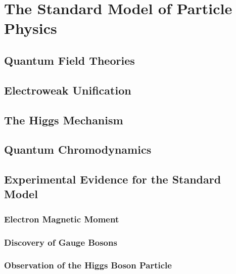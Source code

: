 \section{The Standard Model of Particle Physics}

\subsection{Quantum Field Theories}

\subsection{Electroweak Unification}

\subsection{The Higgs Mechanism}

\subsection{Quantum Chromodynamics}

\subsection{Experimental Evidence for the Standard Model}

\subsubsection{Electron Magnetic Moment}

\subsubsection{Discovery of Gauge Bosons}

\subsubsection{Observation of the Higgs Boson Particle}